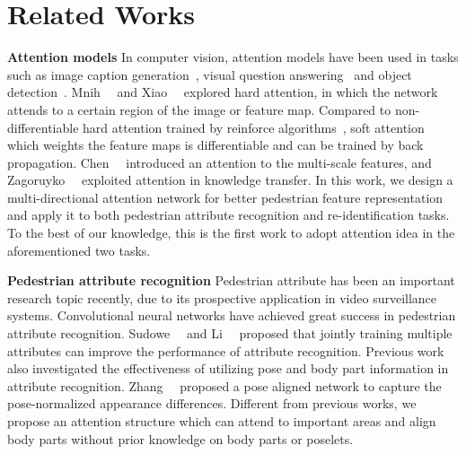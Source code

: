 \documentclass[10pt,twocolumn,letterpaper]{article}
\begin{document}

\section{Related Works}
\label{sec:related_work}

\noindent \textbf{Attention models}
In computer vision, attention models have been used in tasks such as image caption generation~\cite{xu2015show}, visual question answering~\cite{lu2016hierarchical,xu2016ask} and object detection~\cite{ba2014multiple}.
Mnih~\etal~\cite{mnih2014recurrent} and Xiao~\etal~\cite{xiao2015application} explored hard attention, in which the network attends to a certain region of the image or feature map.
Compared to non-differentiable hard attention trained by reinforce algorithms~\cite{williams1992simple}, soft attention which weights the feature maps is differentiable and can be trained by back propagation.
Chen~\etal~\cite{chen2016attention} introduced an attention to the multi-scale features, and Zagoruyko~\etal~\cite{zagoruyko2016paying} exploited attention in knowledge transfer. In this work, we design a multi-directional attention network for better pedestrian feature representation and apply it to both pedestrian attribute recognition and re-identification tasks. To the best of our knowledge, this is the first work to adopt attention idea in the aforementioned two tasks.

\noindent\textbf{Pedestrian attribute recognition}
Pedestrian attribute has been an important research topic recently, due to its prospective application in video surveillance systems. Convolutional neural networks have achieved great success in pedestrian attribute recognition. Sudowe~\etal~\cite{sudowe2015person} and Li~\etal~\cite{li2015multi} proposed that jointly training multiple attributes can improve the performance of attribute recognition.
Previous work also investigated the effectiveness of utilizing pose and body part information in attribute recognition.
Zhang~\etal~\cite{zhang2014panda} proposed a pose aligned network to capture the pose-normalized appearance differences.
Different from previous works, we propose an attention structure which can attend to important areas and align body parts without prior knowledge on body parts or poselets.
\end{document}
